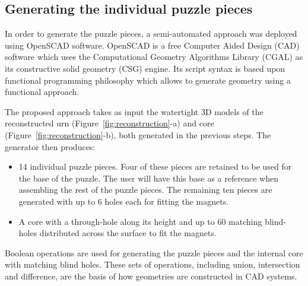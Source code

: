 \documentclass[acmlarge,screen,dvipsnames]{acmart}
\begin{document}
\subsection{Generating the individual puzzle pieces}

In order to generate the puzzle pieces, a semi-automated approach was
deployed using OpenSCAD software. OpenSCAD is a free Computer Aided
Design (CAD) software which uses the Computational Geometry Algorithms
Library (CGAL) as its constructive solid geometry (CSG) engine. Its
script syntax is based upon functional programming philosophy which
allows to generate geometry using a functional approach.

The proposed approach takes as input the watertight 3D models of the
reconstructed urn (Figure~\ref{fig:reconstruction}-a) and core
(Figure~\ref{fig:reconstruction}-b), both generated in the previous
steps. The generator then produces:
%
\begin{itemize}
\item 14 individual puzzle pieces. Four of these pieces are retained
  to be used for the base of the puzzle. The user will have this base
  as a reference when assembling the rest of the puzzle pieces. The
  remaining ten pieces are generated with up to 6 holes each for
  fitting the magnets.
\item A core with a through-hole along its height and up to 60
  matching blind-holes distributed across the surface to fit the
  magnets.
\end{itemize}

Boolean operations are used for generating the puzzle pieces and the
internal core with matching blind holes. These sets of operations,
including union, intersection and difference, are the basis of how
geometries are constructed in CAD systems.
\end{document}
